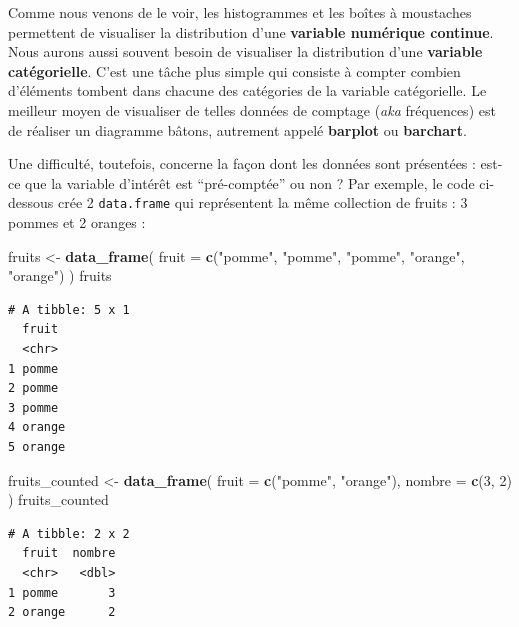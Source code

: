 \documentclass[a4paperpaper,]{article}
\newenvironment{Shaded}{\begin{snugshade}}{\end{snugshade}}
\newcommand{\KeywordTok}[1]{\textcolor[rgb]{0.13,0.29,0.53}{\textbf{#1}}}
\newcommand{\DataTypeTok}[1]{\textcolor[rgb]{0.13,0.29,0.53}{#1}}
\newcommand{\DecValTok}[1]{\textcolor[rgb]{0.00,0.00,0.81}{#1}}
\newcommand{\StringTok}[1]{\textcolor[rgb]{0.31,0.60,0.02}{#1}}
\newcommand{\NormalTok}[1]{#1}
\theoremstyle{definition}
\theoremstyle{definition}
\theoremstyle{definition}
\theoremstyle{remark}
\begin{document}
Comme nous venons de le voir, les histogrammes et les boîtes à
moustaches permettent de visualiser la distribution d'une
\textbf{variable numérique continue}. Nous aurons aussi souvent besoin
de visualiser la distribution d'une \textbf{variable catégorielle}.
C'est une tâche plus simple qui consiste à compter combien d'éléments
tombent dans chacune des catégories de la variable catégorielle. Le
meilleur moyen de visualiser de telles données de comptage (\emph{aka}
fréquences) est de réaliser un diagramme bâtons, autrement appelé
\textbf{barplot} ou \textbf{barchart}.

Une difficulté, toutefois, concerne la façon dont les données sont
présentées : est-ce que la variable d'intérêt est ``pré-comptée'' ou non
? Par exemple, le code ci-dessous crée 2 \texttt{data.frame} qui
représentent la même collection de fruits : 3 pommes et 2 oranges :

\begin{Shaded}
\begin{Highlighting}[]
\NormalTok{fruits <-}\StringTok{ }\KeywordTok{data_frame}\NormalTok{(}
  \DataTypeTok{fruit =} \KeywordTok{c}\NormalTok{(}\StringTok{"pomme"}\NormalTok{, }\StringTok{"pomme"}\NormalTok{, }\StringTok{"pomme"}\NormalTok{, }\StringTok{"orange"}\NormalTok{, }\StringTok{"orange"}\NormalTok{)}
\NormalTok{)}
\NormalTok{fruits}
\end{Highlighting}
\end{Shaded}

\begin{verbatim}
# A tibble: 5 x 1
  fruit 
  <chr> 
1 pomme 
2 pomme 
3 pomme 
4 orange
5 orange
\end{verbatim}

\begin{Shaded}
\begin{Highlighting}[]
\NormalTok{fruits_counted <-}\StringTok{ }\KeywordTok{data_frame}\NormalTok{(}
  \DataTypeTok{fruit =} \KeywordTok{c}\NormalTok{(}\StringTok{"pomme"}\NormalTok{, }\StringTok{"orange"}\NormalTok{),}
  \DataTypeTok{nombre =} \KeywordTok{c}\NormalTok{(}\DecValTok{3}\NormalTok{, }\DecValTok{2}\NormalTok{)}
\NormalTok{)}
\NormalTok{fruits_counted}
\end{Highlighting}
\end{Shaded}

\begin{verbatim}
# A tibble: 2 x 2
  fruit  nombre
  <chr>   <dbl>
1 pomme       3
2 orange      2
\end{verbatim}
\end{document}

